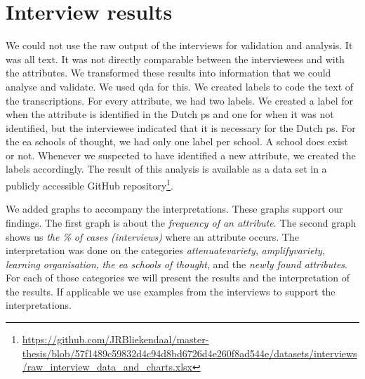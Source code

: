 \section{Interview results}
\label{sec:interviewresults}
We could not use the raw output of the interviews for validation and analysis. It was all text. It was not directly comparable between the interviewees and with the \glspl{attribute}. We transformed these results into information that we could analyse and validate. We used \gls{qda} for this. We created labels to code the text of the transcriptions. For every \gls{attribute}, we had two labels. We created a label for when the \gls{attribute} is identified in the Dutch \gls{ps} and one for when it was not identified, but the interviewee indicated that it is necessary for the Dutch \gls{ps}. For the \gls{ea} schools of thought, we had only one label per school. A school does exist or not. Whenever we suspected to have identified a new attribute, we created the labels accordingly. The result of this analysis is available as a data set in a publicly accessible GitHub repository\footnote{\url{https://github.com/JRBliekendaal/master-thesis/blob/57f1489c59832d4c94d8bd6726d4e260f8ad544e/datasets/interviews/raw_interview_data_and_charts.xlsx}}.  

We added graphs to accompany the interpretations. These graphs support our findings. The first graph is about the \textit{frequency of an \gls{attribute}}. The second graph shows us \textit{the \% of cases (interviews)} where an \gls{attribute} occurs. The interpretation was done on the categories \textit{\gls{attenuatevariety}}, \textit{\gls{amplifyvariety}}, \textit{learning organisation}, \textit{the \gls{ea} schools of thought}, and the \textit{newly found \glspl{attribute}}. For each of those categories we will present the results and the interpretation of the results. If applicable we use examples from the interviews to support the interpretations.
